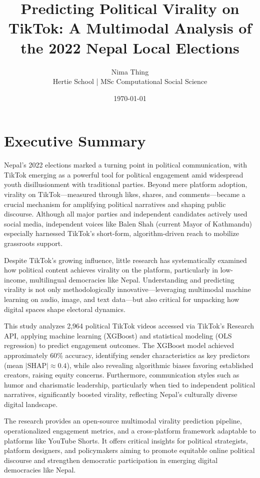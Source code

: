 \documentclass[12pt,a4paper]{report}
\title{\textbf{Predicting Political Virality on TikTok: A Multimodal Analysis of the 2022 Nepal Local Elections}}
\author{Nima Thing\\Hertie School | MSc Computational Social Science}
\date{\today}
\begin{document}
\maketitle


\chapter{Executive Summary}

Nepal’s 2022 elections marked a turning point in political communication, with TikTok emerging as a powerful tool for political engagement amid widespread youth disillusionment with traditional parties. Beyond mere platform adoption, virality on TikTok—measured through likes, shares, and comments—became a crucial mechanism for amplifying political narratives and shaping public discourse. Although all major parties and independent candidates actively used social media, independent voices like Balen Shah (current Mayor of Kathmandu) especially harnessed TikTok’s short-form, algorithm-driven reach to mobilize grassroots support.

Despite TikTok’s growing influence, little research has systematically examined how political content achieves virality on the platform, particularly in low-income, multilingual democracies like Nepal. Understanding and predicting virality is not only methodologically innovative—leveraging multimodal machine learning on audio, image, and text data—but also critical for unpacking how digital spaces shape electoral dynamics.

This study analyzes 2,964 political TikTok videos accessed via TikTok’s Research API, applying machine learning (XGBoost) and statistical modeling (OLS regression) to predict engagement outcomes. The XGBoost model achieved approximately 60\% accuracy, identifying sender characteristics as key predictors (mean $|\text{SHAP}| \approx 0.4$), while also revealing algorithmic biases favoring established creators, raising equity concerns. Furthermore, communication styles such as humor and charismatic leadership, particularly when tied to independent political narratives, significantly boosted virality, reflecting Nepal’s culturally diverse digital landscape.

The research provides an open-source multimodal virality prediction pipeline, operationalized engagement metrics, and a cross-platform framework adaptable to platforms like YouTube Shorts. It offers critical insights for political strategists, platform designers, and policymakers aiming to promote equitable online political discourse and strengthen democratic participation in emerging digital democracies like Nepal.
\end{document}

